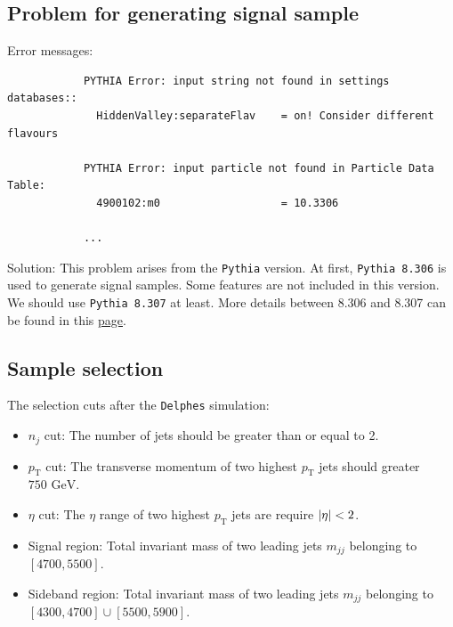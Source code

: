 \documentclass[12pt]{article}
\begin{document}
    \subsection{Problem for generating signal sample}%
    \label{sub:problem_for_generating_signal_sample}
        Error messages:
        \begin{verbatim}
            PYTHIA Error: input string not found in settings databases::
              HiddenValley:separateFlav    = on! Consider different flavours

            PYTHIA Error: input particle not found in Particle Data Table:
              4900102:m0                   = 10.3306

            ...
        \end{verbatim}

        Solution: This problem arises from the \verb|Pythia| version. At first, \verb|Pythia 8.306| is used to generate signal samples. Some features are not included in this version. We should use \verb|Pythia 8.307| at least. More details between 8.306 and 8.307 can be found in this \href{https://pythia.org/history/}{page}.
    \subsection{Sample selection}%
    \label{sub:sample_selection}
        The selection cuts after the \verb|Delphes| simulation:
        \begin{itemize}
            \item $n_j$ cut: The number of jets should be greater than or equal to 2.
            \item $p_{\text{T}}$ cut: The transverse momentum of two highest $p_{\text{T}}$ jets should greater $\text{750 GeV}$.
            \item $\eta$ cut: The $\eta$ range of two highest  $p_{\text{T}}$ jets are require $\abs{\eta} < 2$.
            \item Signal region: Total invariant mass of two leading jets $m_{jj}$ belonging to $[4700,5500]$. 
            \item Sideband region: Total invariant mass of two leading jets $m_{jj}$ belonging to $[4300,4700] \cup [5500,5900]$.
        \end{itemize}
\end{document}
